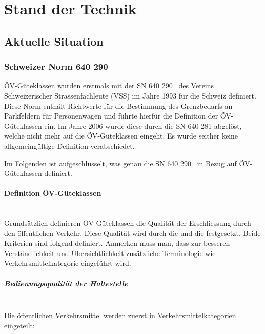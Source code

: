 
\section{Stand der Technik}
\label{Stand der Technik}

\subsection{Aktuelle Situation}
\label{Stand der Technik:Aktuelle Situation}

\subsubsection{Schweizer Norm 640 290}
\label{Aktuelle Situation:Schweizer Norm 640 290}

\gls{ÖV-Güteklassen} wurden erstmals mit der \ac{SN} 640 290~\cite{sn640290} des Vereins Schweizerischer Strassenfachleute (VSS) im Jahre 1993 für die Schweiz definiert.
Diese Norm enthält Richtwerte für die Bestimmung des Grenzbedarfs an Parkfeldern für Personenwagen und führte hierfür die Definition der \gls{ÖV-Güteklassen} ein.
Im Jahre 2006 wurde diese durch die \acs{SN} 640 281 abgelöst, welche nicht mehr auf die \gls{ÖV-Güteklassen} eingeht.
Es wurde seither keine allgemeingültige Definition verabschiedet.

Im Folgenden ist aufgeschlüsselt, was genau die \acs{SN} 640 290~\cite{sn640290} in Bezug auf \gls{ÖV-Güteklassen} definiert.

\paragraph{Definition ÖV-Güteklassen}~\\
\label{Schweizer Norm 640 290:Definition ÖV-Güteklassen}
Grundsätzlich definieren \gls{ÖV-Güteklassen} die Qualität der Erschliessung durch den öffentlichen Verkehr.
Diese Qualität wird durch die  und die  festgesetzt.
Beide Kriterien sind folgend definiert.
Anmerken muss man, dass zur besseren Verständlichkeit und Übersichtlichkeit zusätzliche Terminologie wie Verkehrsmittelkategorie eingeführt wird.

\subparagraph{Bedienungsqualität der Haltestelle}~\\
\label{Definition ÖV-Güteklassen:Bedienungsqualität der Haltestelle}
Die öffentlichen Verkehrsmittel werden zuerst in Verkehrsmittelkategorien eingeteilt:

